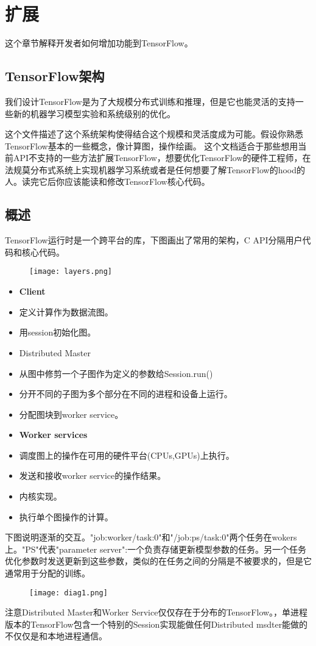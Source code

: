 \chapter{扩展}
这个章节解释开发者如何增加功能到TensorFlow。
\section{TensorFlow架构}
我们设计TensorFlow是为了大规模分布式训练和推理，但是它也能灵活的支持一些新的机器学习模型实验和系统级别的优化。

这个文件描述了这个系统架构使得结合这个规模和灵活度成为可能。假设你熟悉TensorFlow基本的一些概念，像计算图，操作绘画。
这个文档适合于那些想用当前API不支持的一些方法扩展TensorFlow，想要优化TensorFlow的硬件工程师，在法规莫分布式系统上实现机器学习系统或者是任何想要了解TensorFlow的hood的人。读完它后你应该能读和修改TensorFlow核心代码。
\section{概述}
TensorFlow运行时是一个跨平台的库，下图画出了常用的架构，C API分隔用户代码和核心代码。
\begin{center}
\begin{figure}[H]
\texttt{[image: layers.png]}
\end{figure}
\end{center}
\begin{itemize}
\item \textbf{Client}
\item 定义计算作为数据流图。
\item 用session初始化图。
\item Distributed Master
\item 从图中修剪一个子图作为定义的参数给Session.run()
\item 分开不同的子图为多个部分在不同的进程和设备上运行。
\item 分配图块到worker service。
\item \textbf{Worker services}
\item 调度图上的操作在可用的硬件平台(CPUs,GPUs)上执行。
\item 发送和接收worker service的操作结果。
\item 内核实现。
\item 执行单个图操作的计算。
\end{itemize}
下图说明逐渐的交互。"job:worker/task:0"和"/job:ps/task:0"两个任务在wokers上。"PS"代表"parameter server":一个负责存储更新模型参数的任务。另一个任务优化参数时发送更新到这些参数，类似的在任务之间的分隔是不被要求的，但是它通常用于分配的训练。
\begin{figure}[H]
\texttt{[image: diag1.png]}
\end{figure}
注意Distributed Master和Worker Service仅仅存在于分布的TensorFlow。，单进程版本的TensorFlow包含一个特别的Session实现能做任何Distributed msdter能做的不仅仅是和本地进程通信。

